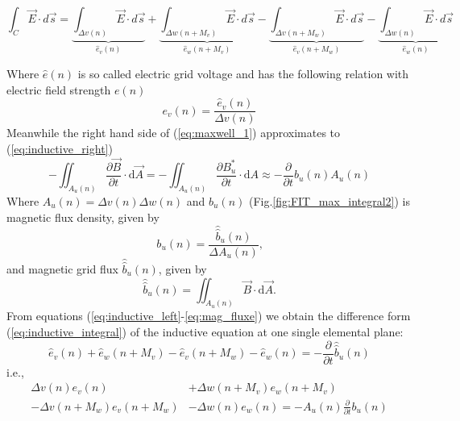 \begin{equation}
\int_{C}\vec{E}\cdot d\vec{s}
=\underbrace{\int_{\Delta v(n)}\vec{E}\cdot d\vec{s}}_{\widehat{e}_{v}(n)}
+\underbrace{\int_{\Delta w(n+M_{v})}\vec{E}\cdot d\vec{s}}_{\widehat{e}_{w}(n+M_{v})}
-\underbrace{\int_{\Delta v(n+M_{w})}\vec{E}\cdot d\vec{s}}_{\widehat{e}_{v}(n+M_{w})}
-\underbrace{\int_{\Delta w(n)}\vec{E}\cdot d\vec{s}}_{\widehat{e}_{w}(n)}
\label{eq:inductive_left}
\end{equation}

Where $\widehat{e}(n)$ is so called  electric grid voltage and has the following relation with electric field strength $e(n)$
\begin{equation}
 e_{v}(n)=\frac{\widehat{e}_{v}(n)}{\Delta v(n)}
\label{eq:e_field}
\end{equation}
Meanwhile the right hand side of (\ref{eq:maxwell_1}) approximates to (\ref{eq:inductive_right})
\begin{equation}
-\iint_{A_{u}(n)}\frac{\partial\vec{B}}{\partial t}\cdot\mathrm{d}\vec{A} 
=-\iint_{A_{u}(n)}\frac{\partial B^{*}_{u}}{\partial t}\cdot\mathrm{d}A
\approx -\frac{\partial}{\partial t}b_{u}(n)A_{u}(n)
\label{eq:inductive_right}
\end{equation}
Where $A_{u}(n)=\Delta v(n)\Delta w(n)$ and $b_{u}(n)$ (Fig.\ref{fig:FIT_max_integral2}) is magnetic flux density, given by
\begin{equation}
 b_{u}(n)=\frac{\widehat{\widehat{b}}_{u}(n)}{\Delta A_{u}(n)} \text{,}
\label{eq:b_flux_density}
\end{equation}
 and magnetic grid flux $\widehat{\widehat{b}}_{u}(n)$, given by
\begin{equation}
\widehat{\widehat{b}}_{u}(n)=\iint_{A_{u}(n)}\vec{B}\cdot\mathrm{d}\vec{A} \text{.}
\label{eq:mag_fluxe}
\end{equation}
From equations (\ref{eq:inductive_left}-\ref{eq:mag_fluxe}) we obtain the difference form (\ref{eq:inductive_integral}) of the inductive equation at one single elemental plane:
\begin{equation}
\widehat{e}_{v}(n)+\widehat{e}_{w}(n+M_{v})-\widehat{e}_{v}(n+M_{w})-\widehat{e}_{w}(n)=-\frac{\partial}{\partial t}\widehat{\widehat{b}}_{u}(n)
\label{eq:inductive_integral}
\end{equation}
i.e.,
\begin{align}
\Delta v(n)e_{v}(n)&+\Delta w(n+M_{v})e_{w}(n+M_{v})\nonumber\\
-\Delta v(n+M_{w})e_{v}(n+M_{w})&-\Delta w(n)e_{w}(n)=-A_{u}(n)\frac{\partial}{\partial{t}}b_{u}(n) 
\label{eq:inductive_sample}
\end{align}
